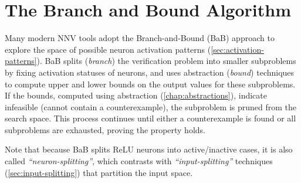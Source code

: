 \documentclass[oneside,11pt,dvipsnames]{book}
\numberwithin{equation}{section}
\theoremstyle{definition}
\newtheorem{problem}{Problem}[section]
\theoremstyle{remark}
\newcommand{\tvn}[1]{\iftoggle{usecomment}{{\color{red}{[TVN]: #1}}}{}}
\begin{document}





\section{The Branch and Bound Algorithm}\label{sec:bab-alg}

Many modern NNV tools adopt the Branch-and-Bound (BaB) approach to explore the space of possible neuron activation patterns (\autoref{sec:activation-patterns}). BaB splits (\emph{branch}) the verification problem into smaller subproblems by fixing activation statuses of neurons, and uses abstraction (\emph{bound}) techniques to compute upper and lower bounds on the output values for these subproblems. If the bounds, computed using abstraction (\autoref{chap:abstractions}), indicate infeasible (cannot contain a counterexample), the subproblem is pruned from the search space. This process continues until either a counterexample is found or all subproblems are exhausted, proving the property holds.

Note that because BaB splits ReLU neurons into active/inactive cases, it is also called \emph{``neuron-splitting''}, which contrasts with \emph{``input-splitting''} techniques (\autoref{sec:input-splitting}) that partition the input space.

\end{document}
